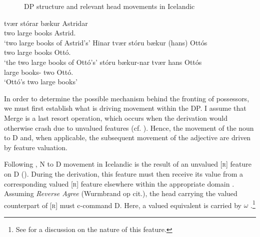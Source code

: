 \documentclass[output=paper]{langscibook}
\begin{document}
\begin{figure}
\caption{DP structure and relevant head movements in Icelandic}\label{hardarsonFullesque}
\end{figure}

\begin{exe}
\ex \begin{xlist}
	\ex	\gll	tvær stórar bækur Astridar \label{hardarsonND}\\
				two large books Astrid.\hardGen{}\\
		\glt	`two large books of Astrid's'
	\ex	\gll	Hinar tvær stóru bækur (hans) Ottós\label{hardarsonFD}\\
				\hardArt{} two large books \hardProp{} Ottó.\hardGen{}\\
		\glt	`the two large books of Ottó's'
	\ex	\gll	stóru bækur-nar tvær hans Ottós \label{hardarsonBD}\\
				large books-\hardArt{} two \hardProp{} Ottó.\hardGen\\
		\glt	`Ottó's two large books'
	\end{xlist}
\end{exe}

In order to determine the possible mechanism behind the fronting of possessors, we must first establish what is driving movement within the DP. 
I assume that Merge is a last resort operation, which occurs when the derivation would otherwise crash due to unvalued features (cf. \citealt{abels2003,boskovic2007,AgreementLooking:2012wf,Wurmbrand:2013tf,Wurmbrand:2012ty,Wurmbrand:uv,Wurmbrand:2014vz,Wurmbrand:2011ua,Wurmbrand:2013tb}). Hence, the movement of the noun to D and, when applicable, the subsequent movement of the adjective are driven by feature valuation.

Following \citet{Hardarson:2016wd}, N to D movement in Icelandic is the result of an unvalued [\textsc{r}] feature on D (). During the derivation, this feature must then receive its value from a corresponding valued [\textsc{r}] feature elsewhere within the appropriate domain \citep[e.g.,][]{pesetsky2007}. Assuming \textit{Reverse Agree} (Wurmbrand op cit.), the head carrying the valued counterpart of [\textsc{r}] must c-command D. Here, a valued equivalent is carried by $\omega$ \citep[147ff]{Hardarson:2016wd}.\footnote{See \citet[147ff]{Hardarson:2016wd} for a discussion on the nature of this feature.}
\end{document}
